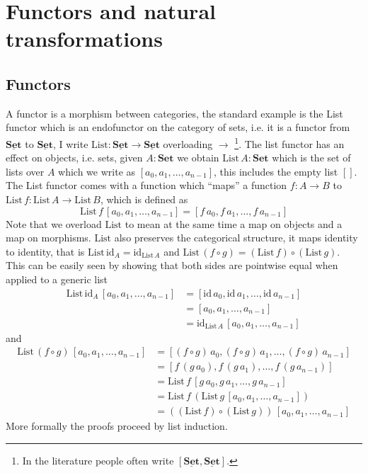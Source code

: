 \documentclass{article}
\newcommand{\Set}{\mathbf{Set}}
\newcommand{\cat}[1]{\underline{\mathbf{#1}}}
\newcommand{\cSet}{\cat{\Set}}
\newcommand{\id}{\mathrm{id}}
\newcommand{\List}{\mathrm{List}}
\begin{document}
\newpage
\section{Functors and natural transformations}
\label{sec:funct-natur-transf}

\subsection{Functors}
\label{sec:functors}

A functor is a morphism between categories, the standard example is the List functor which is an endofunctor on the category of sets, i.e. it is a functor from $\cSet$ to $\cSet$, I write $\List : \cSet \to \cSet$ overloading $\to$%
\footnote{In the literature people often write $[\cSet,\cSet].$}.
The list functor has an effect on objects, i.e. sets, given $A : \Set$ we obtain $\List\,A : \Set$ which is the set of lists over $A$ which we write as $[a_0,a_1,\dots,a_{n-1}]$, this includes the empty list $[]$.
The List functor comes with a function which ``maps'' a function $f : A \to B$ to $\List\,f : \List\,A \to \List\,B$, which is defined as 
\[ \List\,f\, [a_0,a_1,\dots,a_{n-1}] = [f\,a_0,f\,a_1,\dots,f\,a_{n-1}]\]
Note that we overload $\List$ to mean at the same time a map on objects and a map on morphisms. $\List$ also preserves the categorical structure, it maps identity to identity, that is $\List\,\id_A = \id_{\List\,A}$ and 
$\List\,(f\circ g) = (\List\,f) \circ (\List\,g)$. This can be easily seen by showing that both sides are pointwise equal when applied to a generic list
\begin{align*}
\List\,\id_A\, [a_0,a_1,\dots,a_{n-1}] & =  [\id\,a_0,\id\,a_1,\dots,\id\,a_{n-1}] \\
& =  [a_0,a_1,\dots,a_{n-1}] \\
& = \id_{\List\,A}\,  [a_0,a_1,\dots,a_{n-1}]
\end{align*}
and
\begin{align*}
\List\,(f \circ g)\, [a_0,a_1,\dots,a_{n-1}] & =  [(f \circ g)\,a_0,(f\circ g)\,a_1,\dots,(f\circ g)\,a_{n-1}] \\
& =  [f\,(g\,a_0),f\,(g\,a_1),\dots,f \,(g\, a_{n-1})] \\
& = \List\,f\, [g\,a_0,g\,a_1,\dots,g\, a_{n-1}]\\
& = \List\,f\,(\List\,g\, [a_0,a_1,\dots,a_{n-1}])\\
& = ((\List\,f) \circ (\List\,g))\, [a_0,a_1,\dots,a_{n-1}]
\end{align*}
More formally the proofs proceed by list induction.
\end{document}
